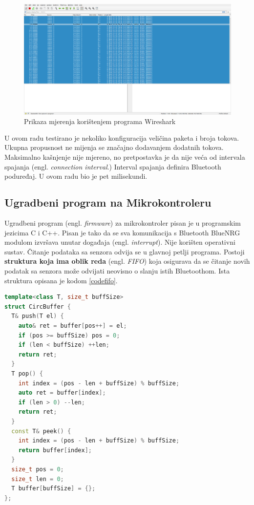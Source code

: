 \documentclass[times, utf8, diplomski]{diplomski}
\begin{document}
\begin{figure}[H]
\includegraphics[width=\textwidth]{wireshark_100sec_20230622_225645.png}
\centering
\caption{Prikaza mjerenja korištenjem programa Wireshark \cite{wireshark}}
\label{fig:wireshark}
\end{figure}

U ovom radu testirano je nekoliko konfiguracija veličina paketa i broja tokova. Ukupna propusnost ne mijenja se značajno dodavanjem dodatnih tokova. Maksimalno kašnjenje nije mjereno, no pretpostavka je da nije veća od intervala spajanja (engl. \textit{connection interval}.) Interval spajanja definira Bluetooth poduređaj. U ovom radu bio je pet milisekundi.

\subsection{Ugradbeni program na Mikrokontroleru}
Ugradbeni program (engl. \textit{firmware}) za mikrokontroler pisan je u programskim jezicima C i C++. Pisan je tako da se sva komunikacija s Bluetooth BlueNRG modulom izvršava unutar događaja (engl. \textit{interrupt}). Nije korišten operativni sustav. Čitanje podataka sa senzora odvija se u glavnoj petlji programa. Postoji \textbf{struktura koja ima oblik reda} (engl. \textit{FIFO}) koja osigurava da se čitanje novih podatak sa senzora može odvijati neovisno o slanju istih Bluetoothom. Ista struktura opisana je kodom \ref{codefifo}.

\begin{lstlisting}[language=c++, caption={\textit{FIFO} struktura koja omogućuje neovisan dohvat novih podataka i slanje najstarijih}, label={codefifo}]
template<class T, size_t buffSize>
struct CircBuffer {
  T& push(T el) {
    auto& ret = buffer[pos++] = el;
    if (pos >= buffSize) pos = 0;
    if (len < buffSize) ++len;
    return ret;
  }
  T pop() {
    int index = (pos - len + buffSize) % buffSize;
    auto ret = buffer[index];
    if (len > 0) --len;
    return ret;
  }
  const T& peek() {
    int index = (pos - len + buffSize) % buffSize;
    return buffer[index];
  }
  size_t pos = 0;
  size_t len = 0;
  T buffer[buffSize] = {};
};
\end{lstlisting}
\end{document}
